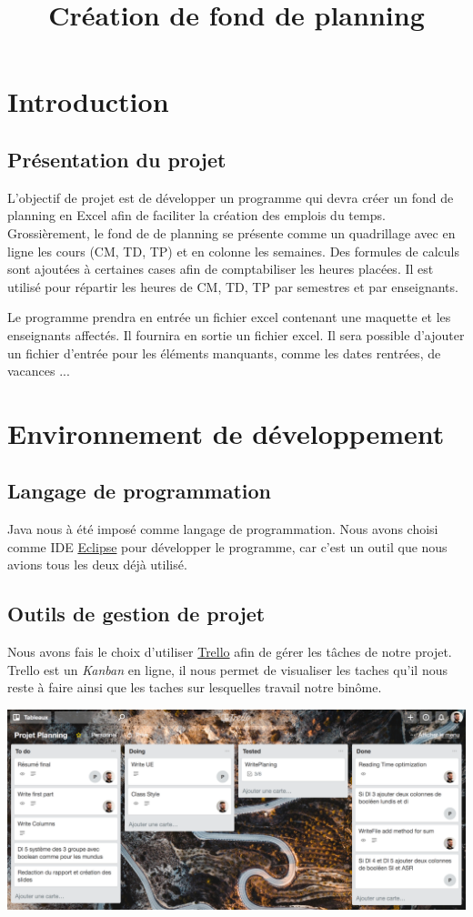 \documentclass{polytech/polytech}
\title{Création de fond de planning}
\begin{document}
	\chapter{Introduction}
	\section{Présentation du projet}
	L’objectif de projet est de développer un programme qui devra créer un fond de planning en Excel afin de faciliter la création des emplois du temps.
	Grossièrement, le fond de de planning se présente comme un quadrillage avec en ligne les cours (CM, TD, TP) et en colonne les semaines.
	Des formules de calculs sont ajoutées à certaines cases afin de comptabiliser les heures placées.
	Il est utilisé pour répartir les heures de CM, TD, TP par semestres et par enseignants.

	Le programme prendra en entrée un fichier excel contenant une maquette et les enseignants affectés. Il fournira en sortie un fichier excel.
	Il sera possible d'ajouter un fichier d'entrée pour les éléments manquants, comme les dates rentrées, de vacances ...

	\chapter{Environnement de développement}
	\section{Langage de programmation}

	Java nous à été imposé comme langage de programmation.
	Nous avons choisi comme IDE \href{http://www.eclipse.org}{Eclipse} pour développer le programme, car c'est un outil que nous avions tous les deux déjà utilisé.


	\section{Outils de gestion de projet}

	Nous avons fais le choix d'utiliser \href{https://trello.com/}{Trello} afin de gérer les tâches de notre projet.
	Trello est un \textit{Kanban} en ligne, il nous permet de visualiser les taches qu'il nous reste à faire ainsi que les taches sur lesquelles travail notre binôme.

	\includegraphics[width=\textwidth]{./img/trello.png}
\end{document}
